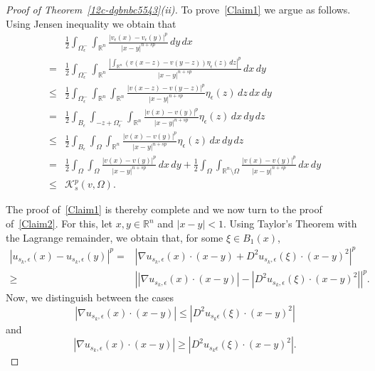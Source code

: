 \documentclass[12pt]{article}
\newcommand{\R}{\mathbb{R}}
\numberwithin{equation}{section}
\renewcommand{\leq}{\leqslant}
\renewcommand{\geq}{\geqslant}
\begin{document}
\begin{proof}[Proof of Theorem~\ref{12c-dgbnbc5543}(ii)]
To prove~\eqref{Claim1} we argue as follows.
Using Jensen inequality we obtain that 
\begin{equation*}
\begin{split}
&\frac{1}{2}\int_{\Omega_{\epsilon}^{-}}\int_{\R^n}\frac{\left|v_\epsilon(x)-v_\epsilon(y)\right|^p}{\left|x-y\right|^{n+sp}}\,dy\,dx\\
= &\frac{1}{2}\int_{\Omega_{\epsilon}^{-}}\int_{\R^n} \frac{\left|\int_{\R^n}\left(v(x-z)-v(y-z)\right)\eta_\epsilon(z)\,dz\right|^p}{\left|x-y\right|^{n+sp}}\,dx\,dy\\
\leq  &\frac{1}{2}\int_{\Omega_{\epsilon}^{-}}\int_{\R^n}\int_{\R^n} \frac{\left|v(x-z)-v(y-z)\right|^p}{\left|x-y\right|^{n+sp}}\eta_{\epsilon}(z)\,dz\,dx\,dy\\
= &\frac{1}{2}\int_{B_\epsilon} \int_{-z+\Omega_{\epsilon}^{-}}\int_{\R^n}\frac{\left|v(x)-v(y)\right|^p}{\left|x-y\right|^{n+sp}}\eta_{\epsilon}(z)\,dx\,dy\,dz\\
\leq & \frac{1}{2}\int_{B_\epsilon} \int_{\Omega}\int_{\R^n}\frac{\left|v(x)-v(y)\right|^p}{\left|x-y\right|^{n+sp}}\eta_{\epsilon}(z)\,dx\,dy\,dz\\
=&\frac{1}{2} \int_{\Omega}\int_{\Omega}\frac{\left|v(x)-v(y)\right|^p}{\left|x-y\right|^{n+sp}}\,dx\,dy+ \frac{1}{2}\int_{\Omega}\int_{\R^n\setminus \Omega}\frac{\left|v(x)-v(y)\right|^p}{\left|x-y\right|^{n+sp}}\,dx\,dy\\
\leq & \mathcal{K}_s^p(v,\Omega).
\end{split}
\end{equation*}

The proof of~\eqref{Claim1} is thereby complete and we now turn to the
proof of~\eqref{Claim2}. For this,
let $x,y\in \R^n$ and $\left|x-y\right|<1$. Using Taylor's Theorem with the Lagrange remainder, we obtain that, for some $\xi \in B_{1}(x)$,
\begin{equation}\label{tedodoro}
\begin{split}
\left|u_{s_k,\epsilon}(x)-u_{s_k,\epsilon}(y)\right|^p=&\left|\nabla u_{s_k,\epsilon} (x) \cdot(x-y)+D^2u_{s_k,\epsilon}(\xi)\cdot(x-y)^2 \right|^p\\
\geq &\left|\left|\nabla u_{s_k,\epsilon} (x) \cdot(x-y)\right|-\left|D^2u_{s_k,\epsilon}(\xi)\cdot(x-y)^2 \right|\right|^p.
\end{split}
\end{equation}
Now, we distinguish between the cases \begin{equation}\label{ca;1}
\left|\nabla u_{s_k,\epsilon} (x) \cdot(x-y)\right|\leq \left|D^2u_{s_k\epsilon}(\xi)\cdot(x-y)^2 \right|\end{equation}
and \begin{equation}\label{ca;2}
\left|\nabla u_{s_k,\epsilon} (x) \cdot(x-y)\right|\geq \left|D^2u_{s_k\epsilon}(\xi)\cdot(x-y)^2 \right|.\end{equation}


\end{proof}
\end{document}

